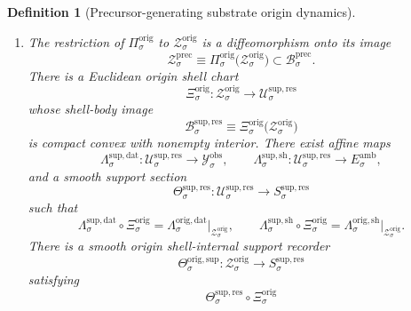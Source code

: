 \documentclass[11pt]{article}
\newcommand{\DataSpace}[1]{\mathcal Y_{#1}^{\mathrm{obs}}}
\newcommand{\AmbientTarget}[1]{E_{#1}^{\mathrm{amb}}}
\newcommand{\EqnTarget}[1]{Q_{#1}^{\mathrm{eqn}}}
\newcommand{\EqnPair}[1]{\mathfrak b_{#1}^{\mathrm{eqn}}}
\newcommand{\ResSpace}[1]{\mathcal U_{#1}^{\mathrm{sup,res}}}
\newcommand{\ResBody}[1]{\mathcal B_{#1}^{\mathrm{sup,res}}}
\newcommand{\ResTarget}[1]{S_{#1}^{\mathrm{sup,res}}}
\newcommand{\ResPair}[1]{\mathfrak m_{#1}^{\mathrm{sup,res}}}
\newcommand{\ResSection}[1]{\Theta_{#1}^{\mathrm{sup,res}}}
\newcommand{\ResData}[1]{\Lambda_{#1}^{\mathrm{sup,dat}}}
\newcommand{\ResShellMap}[1]{\Lambda_{#1}^{\mathrm{sup,sh}}}
\newcommand{\SubSpace}[1]{\mathcal M_{#1}^{\mathrm{sub}}}
\newcommand{\LiftSpace}[1]{\mathcal L_{#1}^{\mathrm{lift}}}
\newcommand{\LiftBody}[1]{\mathcal B_{#1}^{\mathrm{lift}}}
\newcommand{\LiftProj}[1]{\Pi_{#1}^{\mathrm{lift}}}
\newcommand{\PrecSpace}[1]{\mathcal P_{#1}^{\mathrm{prec}}}
\newcommand{\PrecBody}[1]{\mathcal B_{#1}^{\mathrm{prec}}}
\newcommand{\PrecProj}[1]{\Pi_{#1}^{\mathrm{prec}}}
\newcommand{\PrecData}[1]{\Lambda_{#1}^{\mathrm{prec,dat}}}
\newcommand{\PrecShellMap}[1]{\Lambda_{#1}^{\mathrm{prec,sh}}}
\newcommand{\PrecShellSet}[1]{\mathcal Z_{#1}^{\mathrm{prec}}}
\newcommand{\OrigSpace}[1]{\mathcal O_{#1}^{\mathrm{orig}}}
\newcommand{\OrigBody}[1]{\mathcal B_{#1}^{\mathrm{orig}}}
\newcommand{\OrigProj}[1]{\Pi_{#1}^{\mathrm{orig}}}
\newcommand{\OrigPrecMin}[1]{\mathfrak f_{#1}^{\mathrm{orig,prec}}}
\newcommand{\OrigLiftMin}[1]{\mathfrak f_{#1}^{\mathrm{orig,lift}}}
\newcommand{\OrigSubMin}[1]{\mathfrak m_{#1}^{\mathrm{orig}}}
\newcommand{\OrigSection}[1]{\Gamma_{#1}^{\mathrm{orig}}}
\newcommand{\OrigData}[1]{\Lambda_{#1}^{\mathrm{orig,dat}}}
\newcommand{\OrigShellMap}[1]{\Lambda_{#1}^{\mathrm{orig,sh}}}
\newcommand{\OrigSym}[1]{\mathbb G_{#1}^{\mathrm{orig}}}
\newcommand{\OrigTime}[1]{\vartheta_{#1}^{\mathrm{orig}}}
\newcommand{\OrigShellSet}[1]{\mathcal Z_{#1}^{\mathrm{orig}}}
\newcommand{\OrigChart}[1]{\Xi_{#1}^{\mathrm{orig}}}
\newcommand{\OrigSupport}[1]{\Theta_{#1}^{\mathrm{orig,sup}}}
\newtheorem{definition}{Definition}
\begin{document}
\begin{definition}[Precursor-generating substrate origin dynamics]
\begin{enumerate}
    \[
    \ResPair{\sigma}:
    \ResTarget{\sigma}\times\ResTarget{\sigma}\to\mathbb R,
    \]
    a finite-dimensional real hidden target
    \[
    \EqnTarget{\sigma},
    \]
    and a positive-definite symmetric hidden pairing
    \[
    \EqnPair{\sigma}:
    \EqnTarget{\sigma}\times\EqnTarget{\sigma}\to\mathbb R.
    \]
    There is a compact symmetry group
    \[
    \OrigSym{\sigma}
    \]
    and an involution
    \[
    \OrigTime{\sigma},
    \]
    acting orthogonally on \(\OrigSpace{\sigma}\), \(\PrecSpace{\sigma}\), \(\LiftSpace{\sigma}\), \(\SubSpace{\sigma}\), \(\DataSpace{\sigma}\), \(\AmbientTarget{\sigma}\), and \(\ResTarget{\sigma}\), and by \(\EqnPair{\sigma}\)-isometries on \(\EqnTarget{\sigma}\), preserving \(\OrigBody{\sigma}\), \(\PrecBody{\sigma}\), \(\LiftBody{\sigma}\), \(\OrigProj{\sigma}\), \(\PrecProj{\sigma}\), \(\LiftProj{\sigma}\), \(\OrigPrecMin{\sigma}\), \(\OrigLiftMin{\sigma}\), \(\OrigSubMin{\sigma}\), \(\OrigSection{\sigma}\), \(\PrecData{\sigma}\), \(\PrecShellMap{\sigma}\), \(\OrigData{\sigma}\), and \(\OrigShellMap{\sigma}\).
    \item The restriction of \(\OrigProj{\sigma}\) to \(\OrigShellSet{\sigma}\) is a diffeomorphism onto its image
    \[
    \PrecShellSet{\sigma}
    \equiv
    \OrigProj{\sigma}\bigl(\OrigShellSet{\sigma}\bigr)
    \subset\PrecBody{\sigma}.
    \]
    There is a Euclidean origin shell chart
    \[
    \OrigChart{\sigma}:\OrigShellSet{\sigma}\to\ResSpace{\sigma}
    \]
    whose shell-body image
    \[
    \ResBody{\sigma}
    \equiv
    \OrigChart{\sigma}\bigl(\OrigShellSet{\sigma}\bigr)
    \]
    is compact convex with nonempty interior. There exist affine maps
    \[
    \ResData{\sigma}:\ResSpace{\sigma}\to\DataSpace{\sigma},
    \qquad
    \ResShellMap{\sigma}:\ResSpace{\sigma}\to\AmbientTarget{\sigma},
    \]
    and a smooth support section
    \[
    \ResSection{\sigma}:\ResSpace{\sigma}\to\ResTarget{\sigma}
    \]
    such that
    \begin{equation}
    \ResData{\sigma}\circ\OrigChart{\sigma}
    =
    \OrigData{\sigma}\big|_{\OrigShellSet{\sigma}},
    \qquad
    \ResShellMap{\sigma}\circ\OrigChart{\sigma}
    =
    \OrigShellMap{\sigma}\big|_{\OrigShellSet{\sigma}}.
    \label{eq:origchartreadouts}
    \end{equation}
    There is a smooth origin shell-internal support recorder
    \[
    \OrigSupport{\sigma}:\OrigShellSet{\sigma}\to\ResTarget{\sigma}
    \]
    satisfying
    \begin{equation}
    \ResSection{\sigma}\circ\OrigChart{\sigma}

\end{equation}
\end{enumerate}
\end{definition}
\end{document}
